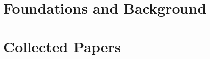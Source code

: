 \documentclass[%
  11pt,               %
  a4paper,            %
  twoside,            %
  openright,          %
  titlepage,          %
  headinclude,        %
  footinclude,        %
  BCOR=5mm,           %
  DIV=calc,           %
  numbers=noenddot    %
]{scrreprt}
\begin{document}
%




\cleardoublepage
\cleardoublepage
\cleardoublepage
\pagestyle{scrheadings} %
\cleardoublepage

\cleardoublepage
\pagestyle{scrheadings}
\cleardoublepage
\part{Foundations and Background}\label{pt:foundations}




\part{Collected Papers}\label{pt:collectedpapers}




\end{document}
